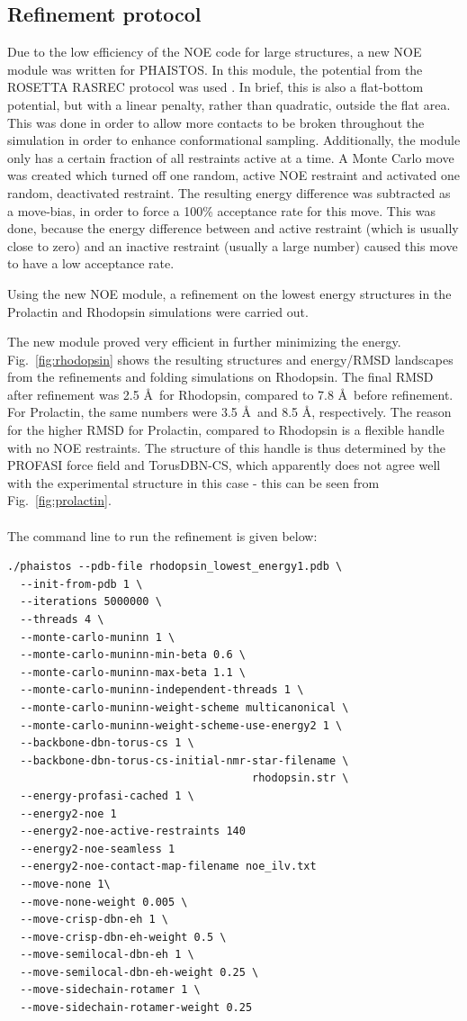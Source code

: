 \subsection{Refinement protocol}

Due to the low efficiency of the NOE code for large structures, a new NOE module was written for PHAISTOS. In this module, the potential from the ROSETTA RASREC protocol was used \cite{LangePNAS2012}.
In brief, this is also a flat-bottom potential, but with a linear penalty, rather than quadratic, outside the flat area.
This was done in order to allow more contacts to be broken throughout the simulation in order to enhance conformational sampling.
Additionally, the module only has a certain fraction of all restraints active at a time.
A Monte Carlo move was created which turned off one random, active NOE restraint and activated one random, deactivated restraint.
The resulting energy difference was subtracted as a move-bias, in order to force a 100\% acceptance rate for this move.
This was done, because the energy difference between and active restraint (which is usually close to zero) and an inactive restraint (usually a large number) caused this move to have a low acceptance rate.

Using the new NOE module, a refinement on the lowest energy structures in the Prolactin and Rhodopsin simulations were carried out.

The new module proved very efficient in further minimizing the energy.
Fig.~\ref{fig:rhodopsin} shows the resulting structures and energy/RMSD landscapes from the refinements and folding simulations on Rhodopsin.
The final RMSD after refinement was 2.5 \AA~for Rhodopsin, compared to 7.8 \AA~before refinement.
For Prolactin, the same numbers were 3.5 \AA~and 8.5 \AA, respectively.
The reason for the higher RMSD for Prolactin, compared to Rhodopsin is a flexible handle with no NOE restraints.
The structure of this handle is thus determined by the PROFASI force field and TorusDBN-CS, which apparently does not agree well with the experimental structure in this case - this can be seen from Fig.~\ref{fig:prolactin}.
\\\\The command line to run the refinement is given below:
\begin{lstlisting}
./phaistos --pdb-file rhodopsin_lowest_energy1.pdb \
  --init-from-pdb 1 \
  --iterations 5000000 \
  --threads 4 \
  --monte-carlo-muninn 1 \
  --monte-carlo-muninn-min-beta 0.6 \
  --monte-carlo-muninn-max-beta 1.1 \
  --monte-carlo-muninn-independent-threads 1 \
  --monte-carlo-muninn-weight-scheme multicanonical \
  --monte-carlo-muninn-weight-scheme-use-energy2 1 \
  --backbone-dbn-torus-cs 1 \
  --backbone-dbn-torus-cs-initial-nmr-star-filename \
                                      rhodopsin.str \
  --energy-profasi-cached 1 \
  --energy2-noe 1
  --energy2-noe-active-restraints 140
  --energy2-noe-seamless 1
  --energy2-noe-contact-map-filename noe_ilv.txt
  --move-none 1\
  --move-none-weight 0.005 \
  --move-crisp-dbn-eh 1 \
  --move-crisp-dbn-eh-weight 0.5 \
  --move-semilocal-dbn-eh 1 \
  --move-semilocal-dbn-eh-weight 0.25 \
  --move-sidechain-rotamer 1 \
  --move-sidechain-rotamer-weight 0.25
\end{lstlisting}

